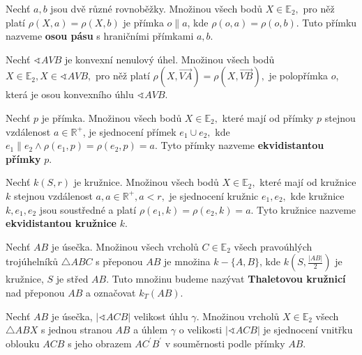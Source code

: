 \begin{definition}
  Nechť $a,b$ jsou dvě různé rovnoběžky. Množinou všech bodů $X\in \mathbb E_2,$ pro něž platí $\rho(X,a)=\rho(X,b)$ je přímka $o\parallel a$, kde $\rho(o,a)=\rho(o,b)$. Tuto přímku nazveme \textbf{osou pásu} s hraničními přímkami $a,b$.
\end{definition}

\begin{veta}
  Nechť $\sphericalangle AVB$ je konvexní nenulový úhel. Množinou všech bodů $X\in \mathbb E_2, X\in \sphericalangle AVB,$ pro něž platí $\rho(X, \overrightarrow{VA})=\rho(X,\overrightarrow{VB}),$ je polopřímka $o$, která je osou konvexního úhlu $\sphericalangle AVB.$
\end{veta} 

\begin{definition}
  Nechť $p$ je přímka. Množinou všech bodů $X \in \mathbb E_2,$ které mají od přímky $p$ stejnou vzdálenost $a\in \mathbb R^+$, je sjednocení přímek $e_1\cup e_2,$ kde $e_1 \parallel e_2 \land \rho(e_1,p)=\rho(e_2,p)=a$. Tyto přímky nazveme 
  \textbf{ekvidistantou přímky} $p$.
\end{definition}

\begin{definition}
  Nechť $k(S,r)$ je kružnice. Množinou všech bodů $X\in \mathbb E_2,$ které mají od kružnice $k$ stejnou vzdálenost $a, a \in \mathbb R^+, a< r,$ je sjednocení kružnic $e_1, e_2,$ kde kružnice $k,e_1,e_2$ jsou soustředné a platí $\rho(e_1,k)= \rho(e_2,k)=a.$ Tyto kružnice nazveme 
  \textbf{ekvidistantou kružnice} $k$.
\end{definition}

\begin{definition}
  Nechť $AB$ je úsečka. Množinou všech vrcholů $C\in \mathbb E_2$ všech pravoúhlých trojúhelníků $\triangle ABC$ s přeponou $AB$ je množina $k-\{ A,B\}$, kde $k\left (S,\frac{|AB|}{2}\right )$ je kružnice, $S$ je střed $AB$. Tuto množinu budeme nazývat \textbf{Thaletovou kružnicí} nad přeponou $AB$ a označovat $k_T(AB).$
\end{definition}

\begin{veta}
  Nechť $AB$ je úsečka, $|\sphericalangle ACB|$ velikost úhlu $\gamma.$ Množinou vrcholů $X\in \mathbb E_2$ všech $\triangle ABX$ s jednou stranou $AB$ a úhlem $\gamma$ o velikosti $|\sphericalangle ACB|$ je sjednocení vnitřku oblouku $ACB$ s jeho obrazem $AC^\prime B^\prime$ v souměrnosti podle přímky $AB$.
\end{veta}

